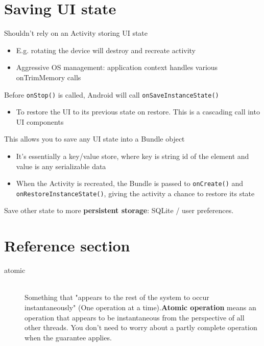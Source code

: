 \documentclass{article}
\begin{document}
\section{Saving UI state}
Shouldn’t rely on an Activity storing UI state
\begin{itemize}
  \item E.g. rotating the device will destroy and recreate activity
  \item Aggressive OS management: application context handles various onTrimMemory calls
\end{itemize}
Before \texttt{onStop()} is called, Android will call \texttt{onSaveInstanceState()}
\begin{itemize}
  \item To restore the UI to its previous state on restore. This is a cascading	call into UI components
\end{itemize}
This allows you to save any UI state into a Bundle object
\begin{itemize}
  \item It's essentially a key/value store, where key is string id of the element and value is any serializable data
  \item When the Activity is recreated, the Bundle is passed to \texttt{onCreate()} and \texttt{onRestoreInstanceState()}, giving the activity a chance to restore its state
\end{itemize}
Save other state to more \textbf{persistent storage}: SQLite / user preferences.


\newpage

\section*{Reference section} \label{sec:reference}
\begin{description}
	\item[atomic] \hfill \\ Something that "appears to the rest of the system to occur instantaneously" (One operation at a time).\textbf{Atomic operation} means an operation that appears to be instantaneous from the perspective of all other threads. You don't need to worry about a partly complete operation when the guarantee applies.
\end{description}
\end{document}
